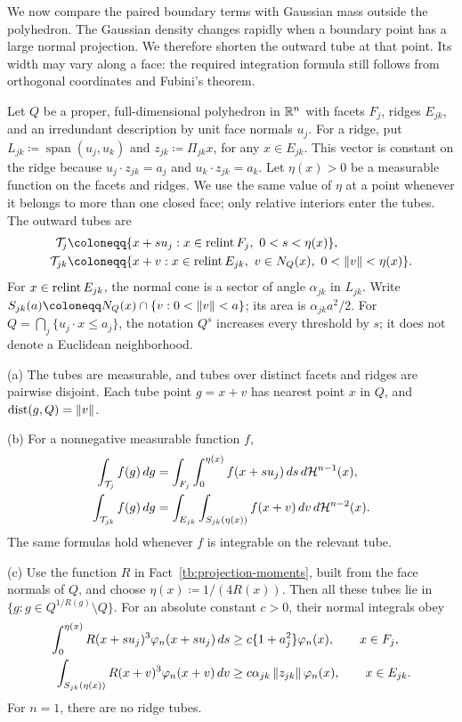 We now compare the paired boundary terms with Gaussian mass outside
the polyhedron. The Gaussian density changes rapidly when a boundary point has a large
normal projection. We therefore shorten the outward tube at that point.
Its width may vary along a face: the required integration formula still
follows from orthogonal coordinates and Fubini's theorem.

Let \(Q\) be a proper, full-dimensional polyhedron in \(\mathbb R^n\) with
facets \(F_j\), ridges \(E_{jk}\), and an irredundant description by
unit face normals \(u_j\). For a ridge, put
\(L_{jk}\coloneqq \operatorname{span}(u_j,u_k)\) and
\(z_{jk}\coloneqq \Pi_{jk}x\), for any \(x\in E_{jk}\). This vector is constant
on the ridge because
\(u_j\cdot z_{jk}=a_j\) and \(u_k\cdot z_{jk}=a_k\).
Let \(\eta(x)>0\) be a measurable function on the facets and ridges.
We use the same value of \(\eta\) at a point whenever it belongs to
more than one closed face; only relative interiors enter the tubes.
The outward tubes are
\begin{align*}
 \mathcal T_j&\coloneqq \{x+s u_j:x\in\relint F_j,\ 0<s<\eta(x)\},\\
 \mathcal T_{jk}&\coloneqq \{x+v:x\in\relint E_{jk},\ v\in N_Q(x),\
                         0<\norm v<\eta(x)\}.
\end{align*}
For \(x\in\operatorname{relint} E_{jk}\), the normal cone is a sector of angle
\(\alpha_{jk}\) in \(L_{jk}\). Write
\(S_{jk}(a)\coloneqq N_Q(x)\cap\{v:0<\norm v<a\}\); its area is
\(\alpha_{jk}a^2/2\). For \(Q=\bigcap_j\{u_j\cdot x\le a_j\}\),
the notation \(Q^s\) increases every threshold by \(s\); it does not
denote a Euclidean neighborhood.

\begin{fact}\label{tb:tubes}
(a) The tubes are measurable, and tubes over distinct facets and
ridges are pairwise disjoint.
Each tube point \(g=x+v\) has nearest point \(x\) in \(Q\), and
\(\operatorname{dist}(g,Q)=\left\lVert v\right\rVert\).

(b) For a nonnegative measurable function \(f\),
\begin{align*}
 \int_{\mathcal T_j}f(g)\,dg
 &=\int_{F_j}\int_0^{\eta(x)} f(x+s u_j)\,ds\,d\mathcal H^{n-1}(x),\\
 \int_{\mathcal T_{jk}}f(g)\,dg
 &=\int_{E_{jk}}\int_{S_{jk}(\eta(x))}f(x+v)\,dv\,d\mathcal H^{n-2}(x).
\end{align*}
The same formulas hold whenever \(f\) is integrable on the relevant tube.

(c) Use the function \(R\) in Fact~\ref{tb:projection-moments}, built
from the face normals of \(Q\), and choose \(\eta(x)\coloneqq 1/(4R(x))\).
Then all these tubes lie in \(\{g:g\in Q^{1/R(g)}\setminus Q\}\).
For an absolute constant \(c>0\), their normal integrals obey
\begin{align*}
 \int_0^{\eta(x)}R(x+s u_j)^3\varphi_n(x+s u_j)\,ds
 &\ge c\{1+a_j^2\}\varphi_n(x),\qquad x\in F_j,\\
 \int_{S_{jk}(\eta(x))}R(x+v)^3\varphi_n(x+v)\,dv
 &\ge c\alpha_{jk}\left\lVert z_{jk}\right\rVert\varphi_n(x),\qquad x\in E_{jk}.
\end{align*}
For \(n=1\), there are no ridge tubes.
\end{fact}


